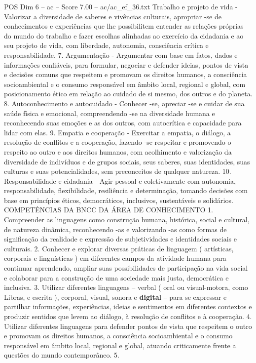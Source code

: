 \begin{textsample}{POS Dim 6 – ac – Score 7.00 – ac/ac\_ef\_36.txt}
Trabalho e projeto de vida - Valorizar a diversidade de saberes e vivências culturais, apropriar -se de conhecimentos e experiências que lhe possibilitem entender as relações próprias do mundo do trabalho e fazer escolhas alinhadas ao exercício da cidadania e ao seu projeto de vida, com liberdade, autonomia, consciência crítica e responsabilidade. 7.
Argumentação - Argumentar com base em fatos, dados e informações confiáveis, para formular, negociar e defender ideias, pontos de vista e decisões comuns que respeitem e promovam os direitos humanos, a consciência socioambiental e o consumo responsável em âmbito local, regional e global, com posicionamento ético em relação ao cuidado de si mesmo, dos outros e do planeta. 8.
Autoconhecimento e autocuidado - Conhecer -se, apreciar -se e cuidar de sua saúde física e emocional, compreendendo -se na diversidade humana e reconhecendo suas emoções e as dos outros, com autocrítica e capacidade para lidar com elas. 9.
Empatia e cooperação - Exercitar a empatia, o diálogo, a resolução de conflitos e a cooperação, fazendo -se respeitar e promovendo o respeito ao outro e aos direitos humanos, com acolhimento e valorização da diversidade de indivíduos e de grupos sociais, seus saberes, suas identidades, suas culturas e suas potencialidades, sem preconceitos de qualquer natureza. 10.
Responsabilidade e cidadania - Agir pessoal e coletivamente com autonomia, responsabilidade, flexibilidade, resiliência e determinação, tomando decisões com base em princípios éticos, democráticos, inclusivos, sustentáveis e solidários.
COMPETÊNCIAS DA BNCC DA ÁREA DE CONHECIMENTO 1.
Compreender as linguagens como construção humana, histórica, social e cultural, de natureza dinâmica, reconhecendo -as e valorizando -as como formas de significação da realidade e expressão de subjetividades e identidades sociais e culturais. 2.
Conhecer e explorar diversas práticas de linguagem ( artísticas, corporais e linguísticas ) em diferentes campos da atividade humana para continuar aprendendo, ampliar suas possibilidades de participação na vida social e colaborar para a construção de uma sociedade mais justa, democrática e inclusiva. 3.
Utilizar diferentes linguagens – verbal ( oral ou visual-motora, como Libras, e escrita ), corporal, visual, sonora e \textbf{digital} – para se expressar e partilhar informações, experiências, ideias e sentimentos em diferentes contextos e produzir sentidos que levem ao diálogo, à resolução de conflitos e à cooperação. 4.
Utilizar diferentes linguagens para defender pontos de vista que respeitem o outro e promovam os direitos humanos, a consciência socioambiental e o consumo responsável em âmbito local, regional e global, atuando criticamente frente a questões do mundo contemporâneo. 5.

\end{textsample}
